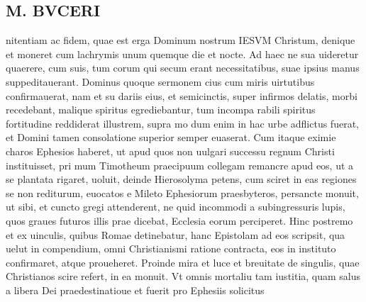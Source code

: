\documentclass{article}
\begin{document}
\begin{pages}
\section*{M. BVCERI }\pstart nitentiam ac fidem, quae est erga Dominum nostrum IESVM Christum, denique et moneret cum lachrymis unum quemque die et nocte. Ad haec ne sua uideretur quaerere, cum suis, tum corum qui secum erant necessitatibus, suae ipsius manus suppeditauerant. Dominus quoque sermonem cius cum miris uirtutibus confirmauerat, nam et su dariis eius, et semicinctis, super infirmos delatis, morbi recedebant, malique spiritus egrediebantur, tum incompa rabili spiritus fortitudine reddiderat illustrem, supra mo dum enim in hac urbe adflictus fuerat, et Domini tamen consolatione superior semper euaserat.   \pend\pstart Cum itaque eximie charos Ephesios haberet, ut apud quos non uulgari successu regnum Christi instituisset, pri mum Timotheum praecipuum collegam remancre apud eos, ut a se plantata rigaret, uoluit, deinde Hierosolyma petens, cum sciret in eas regiones se non rediturum, euocatos e Mileto Ephesiorum praesbyteros, persancte monuit, ut sibi, et cuncto gregi attenderent, ne quid incommodi a subingressuris lupis, quos graues futuros illis prae dicebat, Ecclesia eorum perciperet. Hinc postremo et ex uinculis, quibus Romae detinebatur, hanc Epistolam ad eos scripsit, qua uelut in compendium, omni Christianismi ratione contracta, eos in instituto confirmaret, atque proueheret.  \pend\pstart Proinde mira et luce et breuitate de singulis, quae Christianos scire refert, in ea monuit.  Vt omnis mortaliu tam iustitia, quam salus a libera Dei praedestinatioue et  \pendQuam fuerit pro Ephesiis solicitus 

\end{pages}
\end{document}
